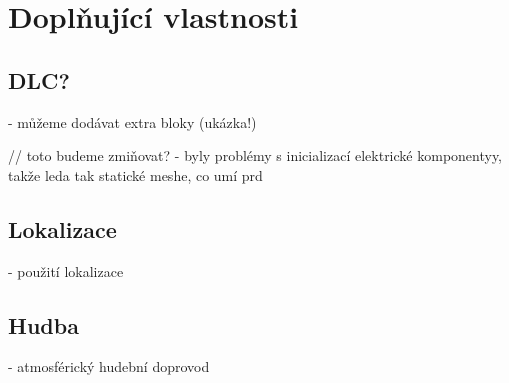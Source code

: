 
\section{Doplňující vlastnosti}

\subsection{DLC?}

- můžeme dodávat extra bloky (ukázka!) 

// toto budeme zmiňovat? - byly problémy s inicializací elektrické komponentyy, takže leda tak statické meshe, co umí prd

\subsection{Lokalizace}

- použití lokalizace 

\subsection{Hudba}

- atmosférický hudební doprovod
